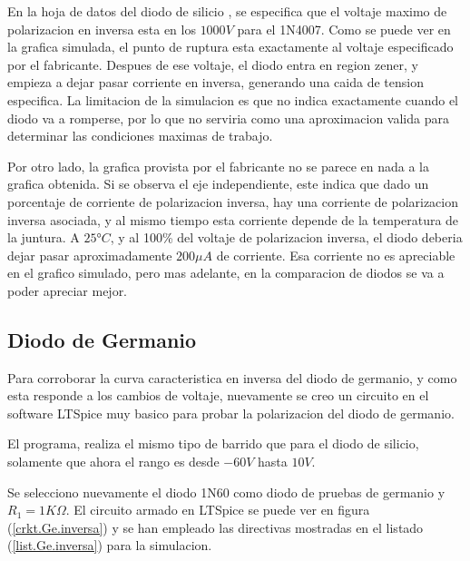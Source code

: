 \documentclass[chaptersright]{informeutn}
\begin{document}
        En la hoja de datos del diodo de silicio \cite{DS0}, se especifica que el voltaje maximo de polarizacion en
        inversa esta en los $1000V$ para el 1N4007. Como se puede ver en la grafica simulada, el punto de ruptura esta
        exactamente al voltaje especificado por el fabricante. Despues de ese voltaje, el diodo entra en region zener,
        y empieza a dejar pasar corriente en inversa, generando una caida de tension especifica. La limitacion de la
        simulacion es que no indica exactamente cuando el diodo va a romperse, por lo que no serviria como una
        aproximacion valida para determinar las condiciones maximas de trabajo.

        Por otro lado, la grafica provista por el fabricante no se parece en nada a la grafica obtenida. Si se observa
        el eje independiente, este indica que dado un porcentaje de corriente de polarizacion inversa, hay una
        corriente de polarizacion inversa asociada, y al mismo tiempo esta corriente depende de la temperatura de la
        juntura. A $25°C$, y al 100\% del voltaje de polarizacion inversa, el diodo deberia dejar pasar aproximadamente
        $200\mu A$ de corriente. Esa corriente no es apreciable en el grafico simulado, pero mas adelante, en la
        comparacion de diodos se va a poder apreciar mejor.

      \subsection{Diodo de Germanio}
        Para corroborar la curva caracteristica en inversa del diodo de germanio, y como esta responde a los cambios de
        voltaje, nuevamente se creo un circuito en el software LTSpice muy basico para probar la polarizacion del diodo
        de germanio.

        El programa, realiza el mismo tipo de barrido que para el diodo de silicio, solamente que ahora el rango es
        desde $-60V$ hasta $10V$.

        Se selecciono nuevamente el diodo 1N60 como diodo de pruebas de germanio y $R_1 = 1K\Omega$. El circuito
        armado en LTSpice se puede ver en figura (\ref{crkt.Ge.inversa}) y se han empleado las directivas mostradas
        en el listado (\ref{list.Ge.inversa}) para la simulacion.
\end{document}
